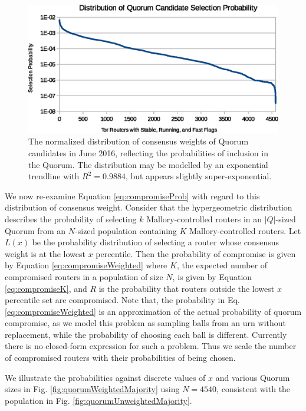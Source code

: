 \documentclass[USenglish,oneside,twocolumn]{article}
\begin{document}
\begin{figure}[h]
	\centering
	\includegraphics[width=\linewidth]{../assets/analysis/QuorumCandidateWeights.eps}
	\caption{The normalized distribution of consensus weights of Quorum candidates in June 2016, reflecting the probabilities of inclusion in the Quorum. The distribution may be modelled by an exponential trendline with $ R^{2} = 0.9884 $, but appears slightly super-exponential.}
	\label{fig:weightDist}
\end{figure}

We now re-examine Equation \ref{eq:compromiseProb} with regard to this distribution of consensus weight. Consider that the hypergeometric distribution describes the probability of selecting $ k $ Mallory-controlled routers in an $ \left\vert{Q}\right\vert $-sized Quorum from an $ N $-sized population containing $ K $ Mallory-controlled routers. Let $ L(x) $ be the probability distribution of selecting a router whose consensus weight is at the lowest $ x $ percentile. Then the probability of compromise is given by Equation \ref{eq:compromiseWeighted} where $ K $, the expected number of compromised routers in a population of size $ N $, is given by Equation \ref{eq:compromiseK}, and $ R $ is the probability that routers outside the  lowest $x$ percentile set are compromised.  Note that, the probability in Eq. \ref{eq:compromiseWeighted}  is an approximation of the actual probability of quorum compromise, as we model this problem as sampling balls from an urn without replacement, while the probability of choosing each ball is different. Currently there is no closed-form expression for such a problem. Thus we scale the number of compromised routers with their probabilities of being chosen.

We illustrate the probabilities against discrete values of $ x $ and various Quorum sizes in Fig. \ref{fig:quorumWeightedMajority} using $ N = 4540 $, consistent with the population in Fig. \ref{fig:quorumUnweightedMajority}.
\end{document}
